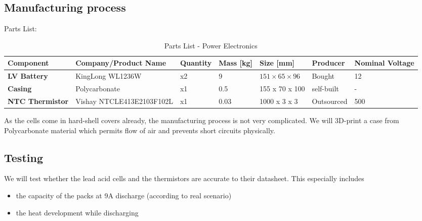 \subsection{Manufacturing process}
Parts List: \\
\begin{table}[ht]
    \centering
    \begin{adjustbox}{width=\textwidth}
    \begin{tabular}{|>{\bfseries}m{2cm}|m{4cm}|m{1.5cm}|m{1.5cm}|m{2cm}|m{2cm}|m{2cm}|}
    \hline
    Component & Company/Product Name & Quantity & Mass [kg] & Size [mm] &  Producer & Nominal Voltage \\
    \hline
    LV Battery & KingLong WL1236W & x2 & 9 & \(151 \times 65 \times 96\) &  Bought & 12 \\
    Casing & Polycarbonate & x1 & 0.5 & 155 x 70 x 100 & self-built & - \\
    NTC Thermistor & Vishay NTCLE413E2103F102L & x1 & 0.03 & 1000 x 3 x 3 & Outsourced & 500 \\
    \hline
    \end{tabular}
    \end{adjustbox}
    \caption{Parts List - Power Electronics}
    \label{table:components}
\end{table}
As the cells come in hard-shell covers already, the manufacturing process is not very complicated. We will 3D-print a case from Polycarbonate material which permits flow of air and prevents short circuits physically.

\subsection{Testing}
We will test whether the lead acid cells and the thermistors are accurate to their datasheet. This especially includes \begin{itemize}
    \item the capacity of the packs at 9A discharge (according to real scenario)
    \item the heat development while discharging
\end{itemize}
